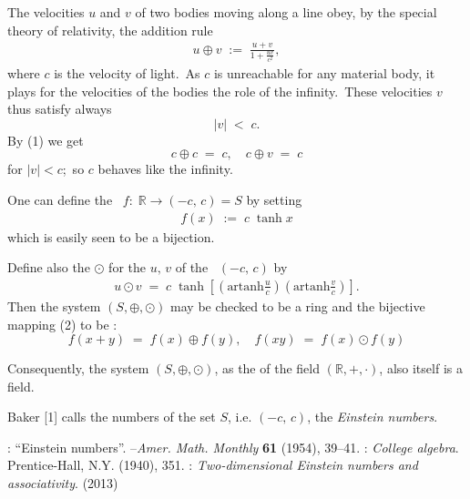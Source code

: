 \documentclass[12pt]{article}
\begin{document}
The velocities $u$ and $v$ of two bodies moving along a line 
obey, by the special theory of relativity, the addition rule
\begin{align} 
u\oplus v \;:=\; \frac{u+v}{1+\frac{uv}{c^2}},
\end{align}
  where $c$ is the velocity of light.\, As $c$ is unreachable for any material body, it 
  plays for the velocities of the bodies the role of the infinity.\, These velocities $v$
  thus satisfy always
      $$|v| \;<\; c.$$
 By (1) we get
 $$c\oplus c \;=\; c, \quad c \oplus v \;=\; c$$
  for $|v| < c$;\, so $c$ behaves like the infinity.
  
  One can define the \,  $f:\; \mathbb{R} \to (-c,\,c) = S$\; by setting
  \begin{align}
  f(x) \;:=\; c\;\tanh{x}
  \end{align}
  which is easily seen to be a bijection.
  
  Define also the  $\odot$  
  for the  $u,\,v$ of the 
  \, 
  $(-c,\,c)$ by
  \begin{align}
  u \odot v \;=\; c\; 
  \tanh\left[\left(\mbox{artanh}\frac{u}{c}\right)
  \left(\mbox{artanh}\frac{v}{c}\right)\right].
  \end{align}
  Then the system $(S,\oplus,\odot)$ may be checked to be a ring 
  and the bijective mapping (2) to be 
  :
  $$f(x+y) \;=\; f(x)\oplus f(y), \quad 
  f(xy) \;=\; f(x)\odot f(y)$$
  
  
  Consequently, the system $(S,\oplus,\odot)$, as the 
   of 
  the field   $(\mathbb{R},+,\cdot)$, also itself is a field.
  
  Baker [1] calls the numbers of the set $S$, i.e. $(-c,\,c)$, 
  the {\it Einstein numbers}.\\
  
  
\begin{thebibliography}{8}
: ``Einstein numbers''. --\emph{Amer. Math. Monthly} \textbf{61} 
(1954), 39--41.
: \emph{College algebra}. Prentice-Hall, N.Y. (1940), 351.
: \emph{Two-dimensional Einstein 
numbers and associativity}.  
 (2013)
\end{thebibliography}\\
\end{document}

